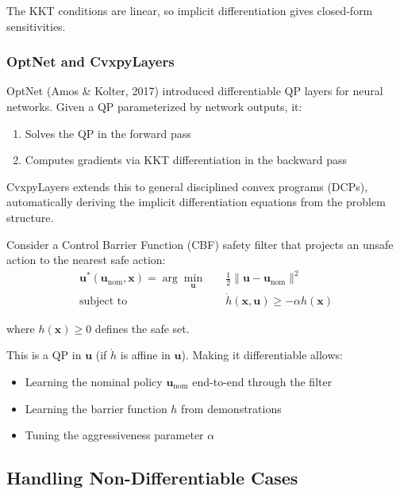 The KKT conditions are linear, so implicit differentiation gives closed-form sensitivities.

\subsubsection{OptNet and CvxpyLayers}

OptNet (Amos \& Kolter, 2017) introduced differentiable QP layers for neural networks. Given a QP parameterized by network outputs, it:
\begin{enumerate}
    \item Solves the QP in the forward pass
    \item Computes gradients via KKT differentiation in the backward pass
\end{enumerate}

CvxpyLayers extends this to general disciplined convex programs (DCPs), automatically deriving the implicit differentiation equations from the problem structure.

\begin{example}
\label{ex:safety_filter}
Consider a Control Barrier Function (CBF) safety filter that projects an unsafe action to the nearest safe action:
\begin{equation}
\begin{aligned}
\mathbf{u}^*(\mathbf{u}_{\text{nom}}, \mathbf{x}) = \arg\min_{\mathbf{u}} \quad & \frac{1}{2} \| \mathbf{u} - \mathbf{u}_{\text{nom}} \|^2 \\
\text{subject to} \quad & \dot{h}(\mathbf{x}, \mathbf{u}) \geq -\alpha h(\mathbf{x})
\end{aligned}
\end{equation}

where $h(\mathbf{x}) \geq 0$ defines the safe set.

This is a QP in $\mathbf{u}$ (if $\dot{h}$ is affine in $\mathbf{u}$). Making it differentiable allows:
\begin{itemize}
    \item Learning the nominal policy $\mathbf{u}_{\text{nom}}$ end-to-end through the filter
    \item Learning the barrier function $h$ from demonstrations
    \item Tuning the aggressiveness parameter $\alpha$
\end{itemize}
\end{example}

\subsection{Handling Non-Differentiable Cases}

